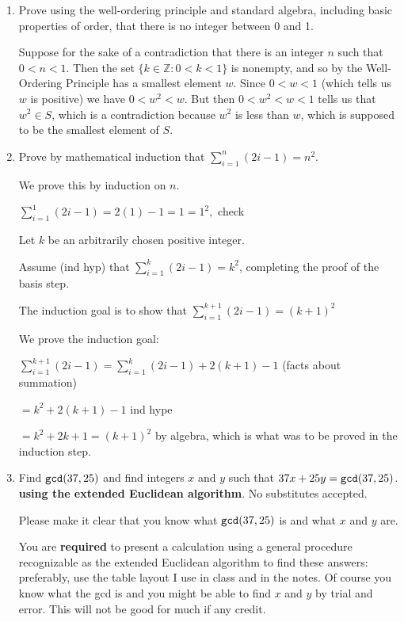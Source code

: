 \documentclass[12pt]{article}
\begin{document}
\begin{enumerate}

\item  

Prove using the well-ordering principle and standard algebra, including basic properties of order, that
there is no integer between 0 and 1.

Suppose for the sake of a contradiction that there is an integer $n$ such that $0 < n < 1$.  Then the set $\{k \in {\mathbb Z}:0<k<1\}$ is nonempty, and so by the Well-Ordering Principle has a smallest element $w$.  Since $0 < w <1$ (which tells us $w$ is positive) we have $0<w^2<w$.  But then $0<w^2<w<1$ tells us that $w^2 \in S$, which is a contradiction because $w^2$ is less than $w$, which is supposed to be the smallest element of $S$.

\newpage

\item

Prove by mathematical induction that $\sum_{i=1}^n (2i-1) = n^2$.

We prove this by induction on $n$.

$\sum_{i=1}^1 (2i-1) = 2(1)-1 = 1 = 1^2,$ check

Let $k$ be an arbitrarily chosen positive integer.  

Assume (ind hyp) that $\sum_{i=1}^k (2i-1) = k^2$, completing the proof of the basis step.

The induction goal is to show that $\sum_{i=1}^{k+1} (2i-1) = (k+1)^2$

We prove the induction goal:  

$\sum_{i=1}^{k+1} (2i-1) = \sum_{i=1}^{k} (2i-1) + 2(k+1)-1$ (facts about summation)

$= k^2 + 2(k+1) -1 $  ind hype

$=k^2+2k+1 = (k+1)^2$ by algebra, which is what was to be proved in the induction step.

\newpage

\item

Find ${\tt gcd}(37,25)$ and find integers $x$ and $y$ such that $37x+25y = {\tt gcd}(37,25)$. {\bf using the extended Euclidean algorithm}.  No substitutes accepted.

Please make it clear that you know what ${\tt gcd}(37,25)$  is and what $x$ and $y$ are.

You are {\bf required} to present a calculation using a general procedure recognizable as the extended Euclidean algorithm to find these answers:  preferably, use the table layout I use in class and in the notes.  Of course you know what the gcd is and you might be able to find $x$ and $y$ by trial and error.  This will not be good for much if any credit.


\end{enumerate}
\end{document}
